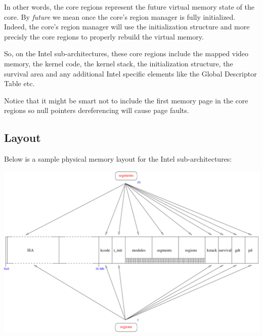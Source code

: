 In other words, the core regions represent the future virtual memory
state of the core. By \textit{future} we mean once the core's region
manager is fully initialized. Indeed, the core's region manager will
use the initialization structure and more precisly the core regions to
properly rebuild the virtual memory.

So, on the Intel sub-architectures, these core regions include the mapped
video memory, the kernel code, the kernel stack, the initialization
structure, the survival area and any additional Intel specific elements
like the Global Descriptor Table etc.

Notice that it might be smart not to include the first memory page in
the core regions so null pointers dereferencing will cause page faults.

%
%

\subsection{Layout}

Below is a sample physical memory layout for the Intel sub-architectures:

\begin{center}
  \includegraphics[scale=0.7]{figures/k1-memory-layout.pdf}
\end{center}

